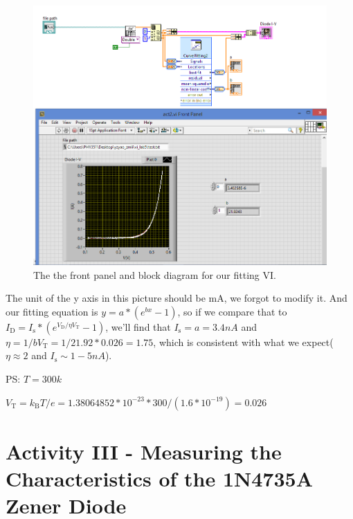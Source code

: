 \documentclass[11pt]{article}
\begin{document}
\begin{figure}[H]
 \begin{center}
  \includegraphics[width=\linewidth/1]{act2}
  \caption{The the front panel and block diagram for our fitting VI.}
  \label{fig:act2}
 \end{center}
\end{figure}

The unit of the y axis in this picture should be mA, we forgot to modify it. And our fitting equation is $y=a*(e^{bx}-1)$, so if we compare that to $I_{\mathrm {D} }=I_{\mathrm {s} }*(e^{V_{\mathrm {D} }/ \eta V_{\mathrm {T} }}-1)$, we'll find that $I_{\mathrm {s} }=a=3.4 nA$ and $\eta=1/{bV_{\mathrm {T} }}=1/{21.92*0.026}=1.75$, which is consistent with what we expect($ \eta \approx 2$ and $I_{\mathrm {s} }\sim 1-5 nA$).

PS: $T=300k$

$V_{\mathrm {T} }=k_{\mathrm {B} }T/e=1.38064852*10^{-23}*300/(1.6*10^{-19})=0.026$



\section{Activity III - Measuring the Characteristics of the 1N4735A Zener Diode}
\end{document}
